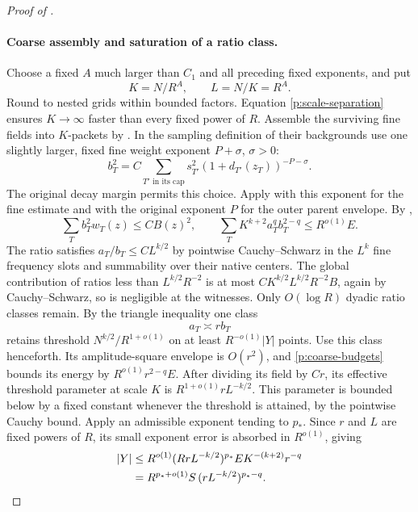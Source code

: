 \begin{proof}[Proof of ]
\paragraph{Coarse assembly and saturation of a ratio class.}
Choose a fixed $A$ much larger than $C_1$ and all preceding fixed exponents,
and put
\[
 K=N/R^A,\qquad L=N/K=R^A.
\]
Round to nested grids within bounded factors.  Equation
\eqref{p:scale-separation} ensures $K\to\infty$ faster than every fixed
power of $R$.  Assemble the surviving fine fields into $K$-packets by
.  In the sampling definition of their backgrounds use
one slightly larger, fixed fine weight exponent $P+\sigma$, $\sigma>0$:
\begin{equation}\label{p:coarse-background}
 b_T^2=C\sum_{T'\text{ in its cap}}s_{T'}^2
                   (1+d_{T'}(z_T))^{-P-\sigma}.
\end{equation}
The original decay margin permits this choice.  Apply
 with this exponent for the fine estimate and
with the original exponent $P$ for the outer parent envelope.  By
,
\begin{equation}\label{p:coarse-budgets}
 \sum_Tb_T^2w_T(z)\leq CB(z)^2,\qquad
 \sum_TK^{k+2}a_T^qb_T^{2-q}\leq R^{o(1)}E.
\end{equation}
The ratio satisfies $a_T/b_T\leq CL^{k/2}$ by pointwise Cauchy--Schwarz
in the $L^k$ fine frequency slots and summability over their native centers.
The global contribution of ratios less than $L^{k/2}R^{-2}$ is at most
$C K^{k/2}L^{k/2}R^{-2}B$, again by Cauchy--Schwarz, so is negligible at
the witnesses.  Only $O(\log R)$ dyadic ratio classes remain.  By the
triangle inequality one class
\[
 a_T\asymp r b_T
\]
retains threshold $N^{k/2}/R^{1+o(1)}$ on at least $R^{-o(1)}|Y|$ points.
Use this class henceforth.  Its amplitude-square envelope is $O(r^2)$, and
\eqref{p:coarse-budgets} bounds its energy by $R^{o(1)}r^{2-q}E$.
After dividing its field by $Cr$, its effective threshold parameter at scale
$K$ is $R^{1+o(1)}rL^{-k/2}$.  This parameter is bounded below by a fixed
constant whenever the threshold is attained, by the pointwise Cauchy bound.
Apply an admissible exponent tending to $p_*$.  Since $r$ and $L$ are fixed
powers of $R$, its small exponent error is absorbed in $R^{o(1)}$, giving
\begin{align}
 |Y|&\leq R^{o(1)}(RrL^{-k/2})^{p_*}
              E K^{-(k+2)}r^{-q}\notag\\
 &=R^{p_*+o(1)}S\,(rL^{-k/2})^{p_*-q}.
 \label{p:ratio-saturation}
\end{align}

\end{proof}
